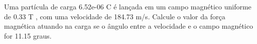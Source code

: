 \documentclass[12pt, addpoints]{exam}
\begin{document}
\begin{questions}
\begin{multicols*}{2}
\begin{oneparchoices}
\end{oneparchoices}
\question[20] Uma partícula de carga 6.52e-06 C é lançada em um campo magnético uniforme de    0.33 T , com uma velocidade de 184.73 m/s. Calcule o valor da força magnética atuando na carga se o ângulo entre a velocidade e o campo magnético for   11.15 graus.

\begin{oneparchoices}
\end{oneparchoices}
\end{multicols*}
\end{questions}
\newpage
\end{document}
